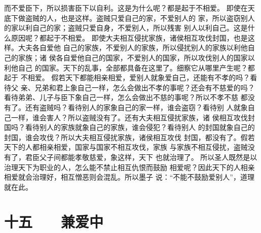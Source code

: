 \documentclass[12pt,UTF8]{ctexbook}
\begin{document}
而不爱臣下，所以损害臣下以自利。这是为什么呢？都是起于不相爱。 
即使在天底下做盗贼的人，也是这样。盗贼只爱自己的家，不爱别人的 
家，所以盗窃别人的家以利自己的家；盗贼只爱自身，不爱别人，所以残害 
别人以利自己。这是什么原因呢？都起于不相爱。 
即使大夫相互侵扰家族，诸侯相互攻伐封国，也是这样。大夫各自爱他 
自己的家族，不爱别人的家族，所以侵扰别人的家族以利他自己的家族；诸 
侯各自爱他自己的国家，不爱别人的国家，所以攻伐别人的国家以利他自己 
的国家。天下的乱事，全部都具备在这里了。细察它从哪里产生呢？都起于 
不相爱。 
假若天下都能相亲相爱，爱别人就象爱自己，还能有不孝的吗？看待父 
亲、兄弟和君上象自己一样，怎么会做出不孝的事呢？还会有不慈爱的吗？ 
看待弟弟、儿子与臣下象自己一样，怎么会做出不慈的事呢？所以不孝不慈 
都没有了。还有盗贼吗？看待别人的家象自己的家一样，谁会盗窃？看待别 
人就象自己一样，谁会害人？所以盗贼没有了。还有大夫相互侵扰家族，诸 
侯相互攻伐封国吗？看待别人的家族就象自己的家族，谁会侵犯？看待别人 
的封国就象自己的封国，谁会攻伐？所以大夫相互侵扰家族，诸侯相互攻伐 
封国，都没有了。假若天下的人都相亲相爱，国家与国家不相互攻伐，家族 
与家族不相互侵扰，盗贼没有了，君臣父子间都能孝敬慈爱，象这样，天下 
也就治理了。 
所以圣人既然是以治理天下为职业的人，怎么能不禁止相互仇恨而鼓励 
相爱呢？因此天下的人相亲相爱就会治理好，相互憎恶则会混乱。所以墨子 
说：“不能不鼓励爱别人”，道理就在此。 

\chapter{十五　　兼爱中}
\end{document}
